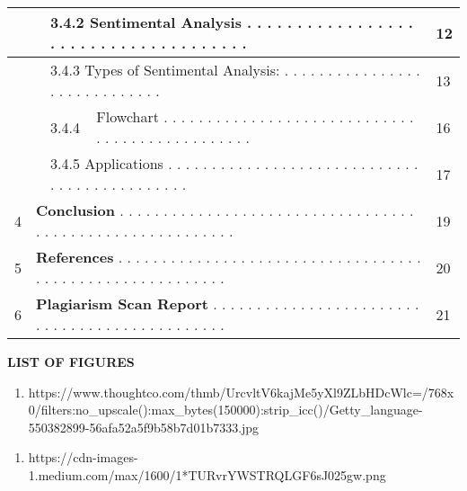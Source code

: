 \documentclass{article} %
\begin{document}
\begin{tabular}{|p{0.2in}|p{0.3in}|p{0.3in}|p{3.1in}|p{0.1in}|}
 &  & \multicolumn{2}{|p{3.5in}|}{3.4.2   Sentimental Analysis  . . . . . . . . . . . . . . . . . . . . . . . . . . . . . . . . . . . . .} & 12 \\ \hline 
 &  & \multicolumn{2}{|p{3.5in}|}{3.4.3   Types of Sentimental Analysis: . . . . . . . . . . . . . . . . . . . . . . . . . . . . . } & 13 \\ \hline 
 &  & 3.4.4 & Flowchart . . . . . . . . . . . . . . . . . . . . . . . . . . . . . . . . . . . . . . . . . . . . . . .    & 16 \\ \hline 
 &  & \multicolumn{2}{|p{3.5in}|}{3.4.5  Applications . . . . . . . . . . . . . . . . . . . . . . . . . . . . . . . . . . . . . . . . . . . . . } & 17 \\ \hline 
4 & \multicolumn{3}{|p{3.8in}|}{\textbf{Conclusion }. . . . . . . . . . .\textbf{ }. . . . . . . . . . . . . . . . . . . . . . . . . . . . . . . . . . . . . . . . . . . . . . } & 19 \\ \hline 
5 & \multicolumn{3}{|p{3.8in}|}{\textbf{References }. . . . . . . . . . . . . . . . . . . . . . . . . . . . . . . . . . . . . . . . . . . . . . . . . . . . . . . . .   } & 20 \\ \hline 
6 & \multicolumn{3}{|p{3.8in}|}{\textbf{Plagiarism Scan Report }. . . . . . . . . . . . . . . . . . . . . . . . . . . . . . . . . . . . . . . . . . . . . . } & 21 \\ \hline 
\end{tabular}



\noindent \eject 

\noindent \textbf{}

\noindent \textbf{\eject }

\noindent \textbf{LIST OF FIGURES}

\noindent 

\begin{enumerate}
\item  https://www.thoughtco.com/thmb/UrcvltV6kajMe5yXl9ZLbHDcWlc=/768x0/filters:no\_upscale():max\_bytes(150000):strip\_icc()/Getty\_language-550382899-56afa52a5f9b58b7d01b7333.jpg
\end{enumerate}

\noindent 

\begin{enumerate}
\item  https://cdn-images-1.medium.com/max/1600/1*TURvrYWSTRQLGF6sJ025gw.png
\end{enumerate}

\noindent 
\end{document}
